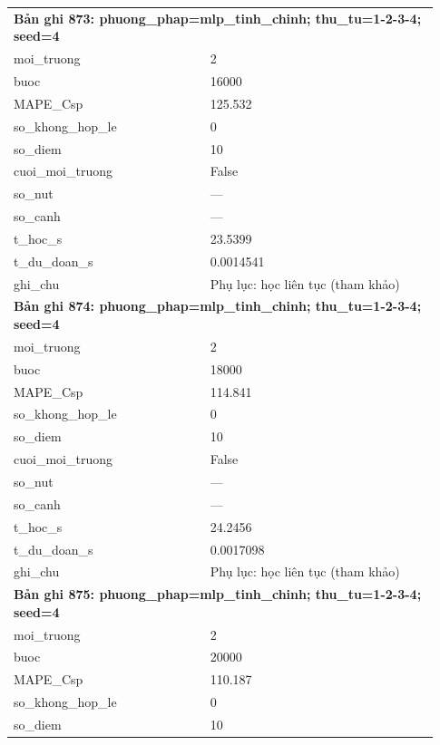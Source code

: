 \begin{longtable}{p{0.43\linewidth}p{0.50\linewidth}}
\midrule
\multicolumn{2}{p{0.95\linewidth}}{\textbf{Bản ghi 873: phuong\_phap=mlp\_tinh\_chinh; thu\_tu=1-2-3-4; seed=4}} \\
moi\_\allowbreak truong & 2 \\
buoc & 16000 \\
MAPE\_\allowbreak Csp & 125.532 \\
so\_\allowbreak khong\_\allowbreak hop\_\allowbreak le & 0 \\
so\_\allowbreak diem & 10 \\
cuoi\_\allowbreak moi\_\allowbreak truong & False \\
so\_\allowbreak nut & — \\
so\_\allowbreak canh & — \\
t\_\allowbreak hoc\_\allowbreak s & 23.5399 \\
t\_\allowbreak du\_\allowbreak doan\_\allowbreak s & 0.0014541 \\
ghi\_\allowbreak chu & Phụ lục: học liên tục (tham khảo) \\
\midrule
\multicolumn{2}{p{0.95\linewidth}}{\textbf{Bản ghi 874: phuong\_phap=mlp\_tinh\_chinh; thu\_tu=1-2-3-4; seed=4}} \\
moi\_\allowbreak truong & 2 \\
buoc & 18000 \\
MAPE\_\allowbreak Csp & 114.841 \\
so\_\allowbreak khong\_\allowbreak hop\_\allowbreak le & 0 \\
so\_\allowbreak diem & 10 \\
cuoi\_\allowbreak moi\_\allowbreak truong & False \\
so\_\allowbreak nut & — \\
so\_\allowbreak canh & — \\
t\_\allowbreak hoc\_\allowbreak s & 24.2456 \\
t\_\allowbreak du\_\allowbreak doan\_\allowbreak s & 0.0017098 \\
ghi\_\allowbreak chu & Phụ lục: học liên tục (tham khảo) \\
\midrule
\multicolumn{2}{p{0.95\linewidth}}{\textbf{Bản ghi 875: phuong\_phap=mlp\_tinh\_chinh; thu\_tu=1-2-3-4; seed=4}} \\
moi\_\allowbreak truong & 2 \\
buoc & 20000 \\
MAPE\_\allowbreak Csp & 110.187 \\
so\_\allowbreak khong\_\allowbreak hop\_\allowbreak le & 0 \\
so\_\allowbreak diem & 10 \\

\end{longtable}
